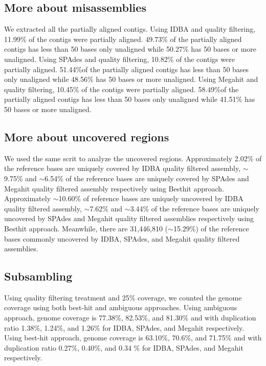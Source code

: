 \subsection*{More about misassemblies} 
We extracted all the partially aligned contigs. Using IDBA and quality filtering, 11.99\% of the contigs were partially aligned. 49.73\% of the partially aligned contigs has less than 50 bases only unaligned while 50.27\% has 50 bases or more unaligned. Using SPAdes and quality filtering, 10.82\% of the contigs were partially aligned. 51.44\%of the partially aligned contigs has less than 50 bases only unaligned while 48.56\% has 50 bases or more unaligned.
Using Megahit and quality filtering,  10.45\% of the contigs were partially aligned.  58.49\%of the partially aligned contigs has less than 50 bases only unaligned while 41.51\% has 50 bases or more unaligned.

 
\subsection*{More about uncovered regions}
 
We used the same scrit {} to analyze the uncovered regions. Approximately 2.02\% of the reference bases are uniquely covered by IDBA quality filtered assembly,  $\sim$9.75\% and  $\sim$6.54\% of the reference bases are uniquely covered by SPAdes and Megahit quality filtered assembly respectively using Besthit approach. 
Approximately   $\sim$10.60\% of reference bases are uniquely uncovered by IDBA quality filtered assembly,  $\sim$7.62\% and  $\sim$3.44\% of the reference bases are uniquely uncovered by SPAdes and Megahit quality filtered assemblies respectively using Besthit approach. Meanwhile, there are  31,446,810  ($\sim$15.29\%)  of the reference bases commonly uncovered by IDBA, SPAdes, and Megahit quality filtered assemblies. 


 
\subsection*{Subsambling}


Using quality filtering treatment and 25\% coverage, we counted the genome coverage using both best-hit and ambiguous approaches. 
Using ambiguous approach, genome coverage is 77.38\%, 82.53\%, and 81.30\% and with duplication ratio 1.38\%, 1.24\%, and 1.26\% for IDBA, SPAdes, and Megahit respectively.
Using best-hit approach, genome coverage is  63.10\%, 70.6\%, and 71.75\%  and with duplication ratio 0.27\%, 0.40\%, and 0.34 \% for IDBA, SPAdes, and Megahit respectively.

